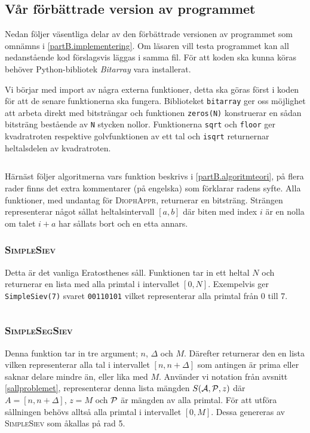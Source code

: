 
\newcommand{\code}[1]{\inputminted[frame=lines,fontsize=\footnotesize,linenos]{python}{code/#1.py}}

\subsection{Vår förbättrade version av programmet}
Nedan följer väsentliga delar av den förbättrade versionen av programmet som omnämns i \ref{partB.implementering}.
Om läsaren vill testa programmet kan all nedanstående kod förslagsvis läggas i samma fil. För att koden ska kunna köras behöver Python-bibliotek \textit{Bitarray} vara installerat.


Vi börjar med import av några externa funktioner, detta ska göras först i koden för att de senare funktionerna ska fungera.
Biblioteket \texttt{bitarray} ger oss möjlighet att arbeta direkt med bitsträngar och funktionen \texttt{zeros(N)} konstruerar en sådan bitsträng bestående av \texttt{N} stycken nollor.
Funktionerna \texttt{sqrt} och \texttt{floor} ger kvadratroten respektive golvfunktionen av ett tal 
och \texttt{isqrt} returnernar heltalsdelen av kvadratroten.
\code{imports}


Härnäst följer algoritmerna vars funktion beskrivs i \ref{partB.algoritmteori}, 
på flera rader finns det extra kommentarer (på engelska) som förklarar radens syfte.
Alla funktioner, med undantag för \textsc{DiophAppr}, returnerar en bitsträng. Strängen representerar något sållat heltalsintervall $[a,b]$ 
där biten med index $i$ är en nolla om talet $i+a$ har sållats bort och en etta annars.


\subsubsection*{\textsc{SimpleSiev}}
Detta är det vanliga Eratosthenes såll. Funktionen tar in ett heltal $N$ och returnerar en lista med alla primtal i intervallet $[0,N]$.
Exempelvis ger \texttt{SimpleSiev(7)} svaret \texttt{00110101} vilket representerar alla primtal från 0 till 7.
\code{SimpleSiev} 


\subsubsection*{\textsc{SimpleSegSiev}}
Denna funktion tar in tre argument; $n$, $\Delta$ och $M$. Därefter returnerar den en lista vilken representerar alla tal i intervallet $[n, n+\Delta]$ som antingen är prima eller saknar delare mindre än, eller lika med $M$. Använder vi notation från avsnitt \ref{sallproblemet}, representerar denna lista mängden $\S{A}{P}{z}$ där $A=[n, n+\Delta]$, $z=M$ och $\P$ är mängden av alla primtal. 
För att utföra sållningen behövs alltså alla primtal i intervallet $[0,M]$. 
Dessa genereras av \textsc{SimpleSiev} som åkallas på rad 5.
\code{SimpleSegSiev}


